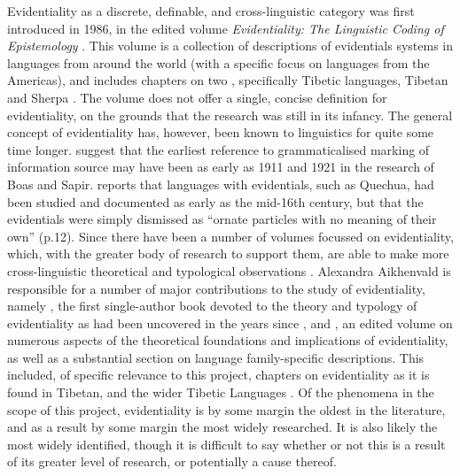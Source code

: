 Evidentiality as a discrete, definable, and cross-linguistic category was first introduced in 1986, in the edited volume \textit{Evidentiality: The Linguistic Coding of Epistemology} \cite{ChafeNichols1986}. This volume is a collection of descriptions of evidentials systems in languages from around the world (with a specific focus on languages from the Americas), and includes chapters on two \lfam, specifically Tibetic languages, Tibetan \cite{DeLancey1986} and Sherpa \cite{Woodbury1986}. The volume does not offer a single, concise definition for evidentiality, on the grounds that the research was still in its infancy. The general concept of evidentiality has, however, been known to linguistics for quite some time longer.  suggest that the earliest reference to grammaticalised marking of information source may have been as early as 1911 and 1921 in the research of Boas and Sapir.  reports that languages with evidentials, such as Quechua, had been studied and documented as early as the mid-16th century, but that the evidentials were simply dismissed as ``ornate particles with no meaning of their own'' (p.12). Since  there have been a number of volumes focussed on evidentiality, which, with the greater body of research to support them, are able to make more cross-linguistic theoretical and typological observations \cite{DendaleTasmowski2001}. Alexandra Aikhenvald is responsible for a number of major contributions to the study of evidentiality, namely , the first single-author book devoted to the theory and typology of evidentiality as had been uncovered in the years since , and , an edited volume on numerous aspects of the theoretical foundations and implications of evidentiality, as well as a substantial section on language family-specific descriptions. This included, of specific relevance to this project, chapters on evidentiality as it is found in Tibetan, and the wider Tibetic Languages \cites{DeLancey2018Evidentiality}{Hyslop2018Evidentiality}. Of the phenomena in the scope of this project, evidentiality is by some margin the oldest in the literature, and as a result by some margin the most widely researched. It is also likely the most widely identified, though it is difficult to say whether or not this is a result of its greater level of research, or potentially a cause thereof.



